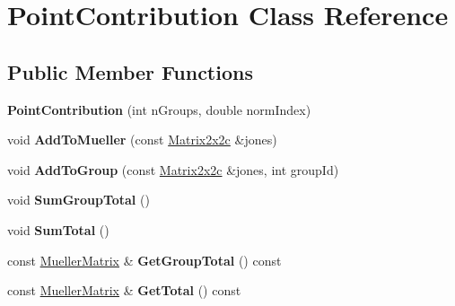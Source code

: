 \hypertarget{class_point_contribution}{}\section{Point\+Contribution Class Reference}
\label{class_point_contribution}
\subsection*{Public Member Functions}
\begin{DoxyCompactItemize}
\item 
\mbox{\label{class_point_contribution_a8fc2f85de43e2d4f04d55878cf6a8d20}} 
{\bfseries Point\+Contribution} (int n\+Groups, double norm\+Index)
\item 
\mbox{\label{class_point_contribution_afb77bda8af6e19e48a69709d0b22d7a5}} 
void {\bfseries Add\+To\+Mueller} (const \mbox{\hyperlink{class_matrix2x2c}{Matrix2x2c}} \&jones)
\item 
\mbox{\label{class_point_contribution_a6939781f8a9ddb713938bcc43bf3b243}} 
void {\bfseries Add\+To\+Group} (const \mbox{\hyperlink{class_matrix2x2c}{Matrix2x2c}} \&jones, int group\+Id)
\item 
\mbox{\label{class_point_contribution_a150cdb6c9d1734baeaf224edaeea5d54}} 
void {\bfseries Sum\+Group\+Total} ()
\item 
\mbox{\label{class_point_contribution_a7b1dab64cd85da8e0451d780391b9e9b}} 
void {\bfseries Sum\+Total} ()
\item 
\mbox{\label{class_point_contribution_abd8d4e97700234a92b22893da6c8155b}} 
const \mbox{\hyperlink{class_mueller_matrix}{Mueller\+Matrix}} \& {\bfseries Get\+Group\+Total} () const
\item 
\mbox{\label{class_point_contribution_ac5e7698f3415b001c904275c249f04b8}} 
const \mbox{\hyperlink{class_mueller_matrix}{Mueller\+Matrix}} \& {\bfseries Get\+Total} () const
\item 
\mbox{\label{class_point_contribution_a1ae18a0d167ce94f4e5d25e5e5eac6b3}} 

\end{DoxyCompactItemize}
